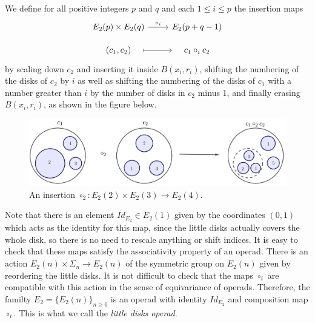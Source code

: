 \documentclass[TFM.tex]{subfiles}
\begin{document}
 We define for all positive integers $p$ and $q$ and  each $1\leq i\leq p$ the insertion maps 
 \[
 \begin{tikzcd}[row sep=10]
  E_2(p)\times E_2(q)\arrow[r, "\circ_i"] & E_2(p+q-1)\\
  (c_1,c_2)\arrow[r, mapsto, shorten <= 1em, shorten >= 1em] & c_1\circ_i c_2
 \end{tikzcd}
 \]
 by scaling down $c_2$ and inserting it inside $B(x_i,r_i)$, shifting the numbering of the disks of $c_2$ by $i$ as well as shifting the numbering of the disks of $c_1$ with a number greater than $i$ by the number of disks in $c_2$ minus 1, and finally erasing $B(x_i,r_i)$, as shown in the figure below. 
 \begin{figure}[h!]
  \centering
\includegraphics[scale=0.3]{Imagenes/insertion}
\caption{An insertion $\circ_2:E_2(2)\times E_2(3)\to E_2(4)$.}
 \end{figure}

Note that there is an element $Id_{E_2}\in E_2(1)$ given by the coordinates $(0,1)$ which acts as the identity for this map, since the little disks actually covers the whole disk, so there is no need to rescale anything or shift indices. It is easy to check that these maps satisfy the associativity property of an operad. There is an action $E_2(n)\times \Sigma_n\to E_2(n)$ of the symmetric group on $E_2(n)$ given by reordering the little disks. It is not difficult to check that the maps $\circ_i$ are compatible with this action in the sense of equivariance of operads. Therefore, the familty $E_2=\{E_2(n)\}_{n\geq 0}$ is an operad with identity $Id_{E_2}$ and composition map $\circ_i$. This is what we call the \emph{little disks operad}.



\end{document}
